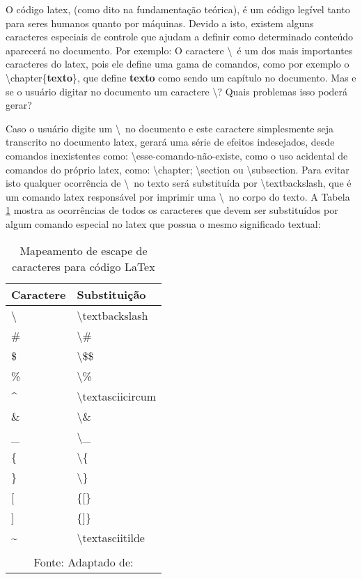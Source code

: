 O código
\acrshort{latex},
(como dito na fundamentação teórica),
é um código legível tanto para seres humanos
quanto por máquinas. Devido a isto, existem alguns caracteres
especiais de controle que ajudam a definir como
determinado conteúdo aparecerá no documento. Por exemplo:
O caractere \textbackslash~é  um dos mais importantes caracteres do
\acrshort{latex},
pois ele
define uma gama de comandos, como por exemplo o \textbackslash chapter\{\textbf{texto}\},
que define
\textbf{texto}
como sendo um capítulo no documento.
Mas e se o usuário digitar no documento um caractere \textbackslash ?
Quais problemas isso poderá gerar?

Caso o usuário digite um \textbackslash~no documento e este caractere simplesmente seja
transcrito no documento
\acrshort{latex},
gerará uma série de efeitos indesejados, desde
comandos inexistentes como: \textbackslash esse-comando-não-existe,
como o uso acidental de comandos do próprio
\acrshort{latex},
como:
\textbackslash chapter; \textbackslash section ou \textbackslash subsection.
Para evitar isto qualquer ocorrência de
\textbackslash~no texto será substituída por \textbackslash textbackslash, que é um comando
\acrshort{latex}
responsável por imprimir uma \textbackslash~no corpo
do texto.
A
Tabela \ref{tbl:escape-characters}
mostra as ocorrências de todos os caracteres que devem ser substituídos
por algum comando especial no
\acrshort{latex}
que possua o mesmo significado textual:

\begin{table}[H]
    \centering
    \caption{Mapeamento de escape de caracteres para código LaTex}
    \label{tbl:escape-characters}
    \renewcommand{\arraystretch}{1.5}
    \begin{tabular}{p{2.5600cm} p{3.8400cm}}
        \hline
        \textbf{Caractere} & \textbf{Substituição} \\
        \hline
        \textbackslash  & \textbackslash textbackslash  \\
		\# & \textbackslash \# \\
		\$ & \textbackslash \$\$ \\
		\% & \textbackslash \% \\
		\textasciicircum  & \textbackslash textasciicircum  \\
		\& & \textbackslash \& \\
		\_ & \textbackslash \_ \\
		\{ & \textbackslash \{ \\
		\} & \textbackslash \} \\
		{[} & \{{[}\} \\
		{]} & \{{]}\} \\
		\textasciitilde  & \textbackslash textasciitilde  \\
        \hline
        \\\multicolumn{2}{c}{\fontsize{10pt}{12pt}Fonte: Adaptado de: \cite{tutorial-latex}}
    \end{tabular}
\end{table}

